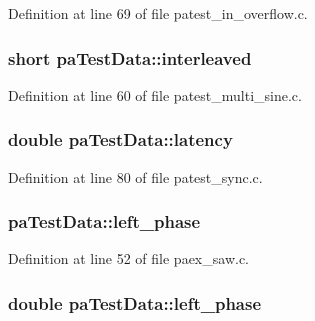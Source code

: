 Definition at line 69 of file patest\+\_\+in\+\_\+overflow.\+c.

\subsubsection[{\texorpdfstring{interleaved}{interleaved}}]{\setlength{\rightskip}{0pt plus 5cm}short pa\+Test\+Data\+::interleaved}\hypertarget{structpa_test_data_aa077ebccde623a61f4753142819882ed}{}\label{structpa_test_data_aa077ebccde623a61f4753142819882ed}


Definition at line 60 of file patest\+\_\+multi\+\_\+sine.\+c.

\subsubsection[{\texorpdfstring{latency}{latency}}]{\setlength{\rightskip}{0pt plus 5cm}double pa\+Test\+Data\+::latency}\hypertarget{structpa_test_data_ab5b574fc78a7372e3dfba68bc1c1ae97}{}\label{structpa_test_data_ab5b574fc78a7372e3dfba68bc1c1ae97}


Definition at line 80 of file patest\+\_\+sync.\+c.

\subsubsection[{\texorpdfstring{left\+\_\+phase}{left_phase}}]{ pa\+Test\+Data\+::left\+\_\+phase}\hypertarget{structpa_test_data_a7395cffc18c4a1734f7e857f21ca1a9b}{}\label{structpa_test_data_a7395cffc18c4a1734f7e857f21ca1a9b}


Definition at line 52 of file paex\+\_\+saw.\+c.

\subsubsection[{\texorpdfstring{left\+\_\+phase}{left_phase}}]{\setlength{\rightskip}{0pt plus 5cm}double pa\+Test\+Data\+::left\+\_\+phase}\hypertarget{structpa_test_data_a995dd5ec4feb90e96f7f625b7e4bf9fb}{}\label{structpa_test_data_a995dd5ec4feb90e96f7f625b7e4bf9fb}


